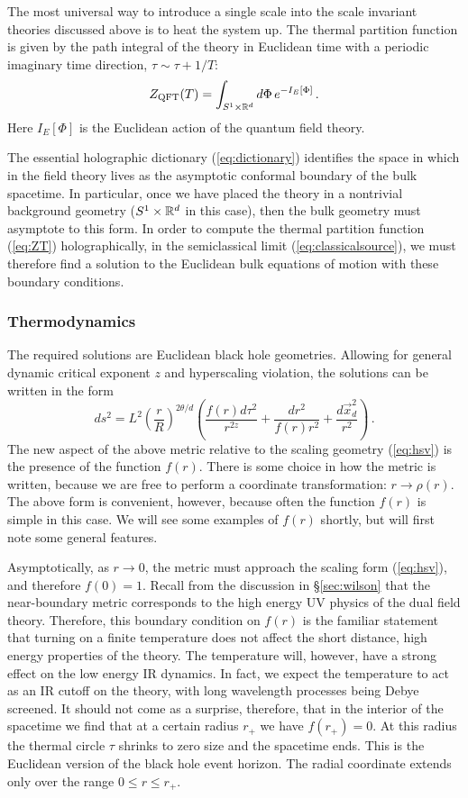 \documentclass[10pt, oneside]{book}
\def\be{\begin{equation}}
\def\ee{\end{equation}}
\def\R{{{\Bbb R}}}
\begin{document}
\begin{doublespace}
The most universal way to introduce a single scale into the scale invariant theories discussed above is to heat the system up.
The thermal partition function is given by the path integral of the theory in Euclidean time with a periodic imaginary time direction, $\tau \sim \tau + 1/T$:
\be\label{eq:ZT}
Z_\text{QFT}(T) = \int_{S^1 \times \R^{d}} d\Phi \, e^{-I_E[\Phi]} \,.
\ee
Here $I_E[\Phi]$ is the Euclidean action of the quantum field theory.

The essential holographic dictionary (\ref{eq:dictionary}) identifies the space in which in the field theory lives as the asymptotic conformal boundary of the bulk spacetime. In particular, once we have placed the theory in a nontrivial background geometry ($S^1 \times \R^d$ in this case), then the bulk geometry must asymptote to this form. In order to compute the thermal partition function (\ref{eq:ZT}) holographically, in the semiclassical limit (\ref{eq:classicalsource}), we must therefore find a solution to the Euclidean bulk equations of motion with these boundary conditions.

\subsubsection{Thermodynamics}

The required solutions are Euclidean black hole geometries. Allowing for general dynamic critical exponent $z$ and hyperscaling violation, the solutions can be written in the form
\be\label{eq:BH2}
ds^2 = L^2 \left(\frac{r}{R}\right)^{2\theta/d} \left(\frac{f(r) d\tau^2}{r^{2z}} + \frac{dr^2}{f(r) r^2}+ \frac{d\vec x^2_{d} }{r^2} \right) \,.
\ee
The new aspect of the above metric relative to the scaling geometry (\ref{eq:hsv}) is the presence of the function $f(r)$. There is some choice in how the metric is written, because we are free to perform a coordinate transformation: $r \to \rho(r)$.
The above form is convenient, however, because often the function $f(r)$ is simple in this case. We will see some examples of $f(r)$ shortly, but will first note some general features.

Asymptotically, as $r \to 0$, the metric must approach the scaling form (\ref{eq:hsv}), and therefore $f(0) = 1$. Recall from the discussion in \S\ref{sec:wilson} that the near-boundary metric corresponds to the high energy UV physics of the dual field theory. Therefore, this boundary condition on $f(r)$ is the familiar statement that turning on a finite temperature does not affect the short distance, high energy properties of the theory. The temperature will, however, have a strong effect on the low energy IR dynamics. In fact, we expect the temperature to act as an IR cutoff on the theory, with long wavelength processes being Debye screened. It should not come as a surprise, therefore, that in the interior of the spacetime we find that at a certain radius $r_+$ we have $f(r_+) = 0$. At this radius the thermal circle $\tau$ shrinks to zero size and the spacetime ends. This is the Euclidean version of the black hole event horizon. The radial coordinate extends only over the range $0 \leq r \leq r_+$. 


\end{doublespace}
\end{document}
